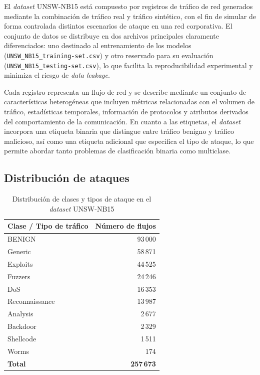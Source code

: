 El \textit{dataset} UNSW-NB15 está compuesto por registros de tráfico de red generados mediante la combinación de tráfico real y tráfico sintético, con el fin de simular de forma controlada distintos escenarios de ataque en una red corporativa. El conjunto de datos se distribuye en dos archivos principales claramente diferenciados: uno destinado al entrenamiento de los modelos (\texttt{UNSW\_NB15\_training-set.csv}) y otro reservado para su evaluación (\texttt{UNSW\_NB15\_testing-set.csv}), lo que facilita la reproducibilidad experimental y minimiza el riesgo de \textit{data leakage}.

Cada registro representa un flujo de red y se describe mediante un conjunto de características heterogéneas que incluyen métricas relacionadas con el volumen de tráfico, estadísticas temporales, información de protocolos y atributos derivados del comportamiento de la comunicación. En cuanto a las etiquetas, el \textit{dataset} incorpora una etiqueta binaria que distingue entre tráfico benigno y tráfico malicioso, así como una etiqueta adicional que especifica el tipo de ataque, lo que permite abordar tanto problemas de clasificación binaria como multiclase.


\subsection{Distribución de ataques}


\begin{table}[htbp]
  \centering
  \caption{Distribución de clases y tipos de ataque en el \textit{dataset} UNSW-NB15}
  \label{tab:unsw-nb15-ataques}
  \begin{tabular}{|l|r|}
    \hline
    \textbf{Clase / Tipo de tráfico} & \textbf{Número de flujos} \\
    \hline
    BENIGN & 93\,000 \\
    \hline
    Generic & 58\,871 \\
    Exploits & 44\,525 \\
    Fuzzers & 24\,246 \\
    DoS & 16\,353 \\
    Reconnaissance & 13\,987 \\
    Analysis & 2\,677 \\
    Backdoor & 2\,329 \\
    Shellcode & 1\,511 \\
    Worms & 174 \\
    \hline
    \textbf{Total} & \textbf{257\,673} \\
    \hline
  \end{tabular}
\end{table}

